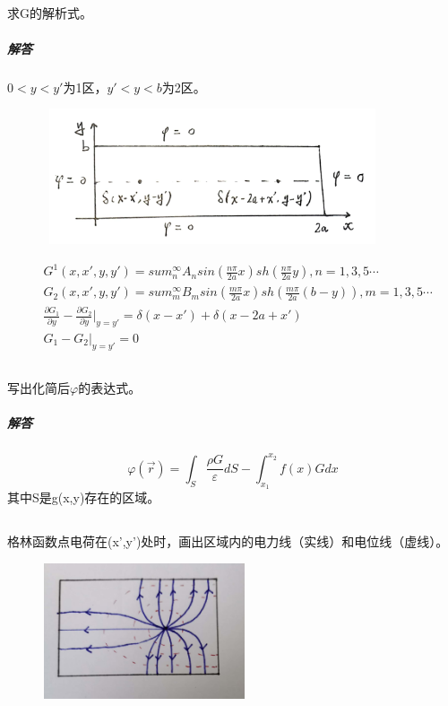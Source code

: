 \documentclass[UTF8]{ctexart}
\begin{document}
\subsection{}
\paragraph{}
求G的解析式。
\subparagraph{解答}
$0<y<y'$为1区，$y'<y<b$为2区。
\begin{figure}[htbp]
\includegraphics[width=10cm,height=4cm]{2018-7.jpg}
\centering
\end{figure}
\begin{equation*}
\begin{aligned}
&G^1(x,x',y,y')=sum_n^{\infty}A_nsin(\frac{n\pi}{2a}x)sh(\frac{n\pi}{2a}y),n=1,3,5\cdots\\
&G_2(x,x',y,y')=sum_m^{\infty}B_msin(\frac{m\pi}{2a}x)sh(\frac{m\pi}{2a}(b-y)),m=1,3,5\cdots\\
&\frac{\partial G_1}{\partial y}-\frac{\partial G_2}{\partial y}\lvert_{y=y'}=\delta(x-x')+\delta(x-2a+x')\\
&G_1-G_2\lvert_{y=y'}=0
\end{aligned}
\end{equation*}
\subsection{}
\paragraph{}
写出化简后$\varphi$的表达式。
\subparagraph{解答}
\[\varphi(\vec r)=\int_S^{}{\frac{\rho G}{\varepsilon}dS}-\int_{x_1}^{x_2}{f(x)Gdx}\]
其中S是g(x,y)存在的区域。
\subsection{}
\paragraph{}
格林函数点电荷在(x',y')处时，画出区域内的电力线（实线）和电位线（虚线）。
\begin{figure}[htbp]
\centering
\includegraphics[width=6cm,height=4cm]{2018-8.jpg}
\end{figure}
\end{document}
